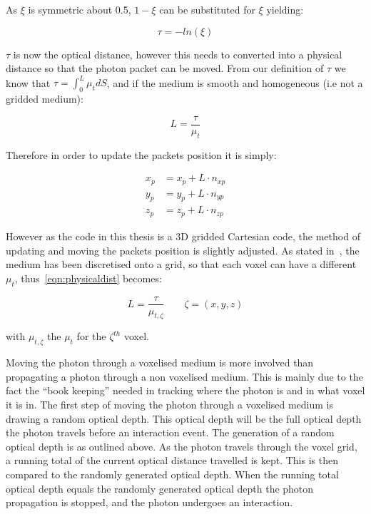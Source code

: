 As $\xi$ is symmetric about 0.5, $1-\xi$ can be substituted for $\xi$ yielding:

\begin{equation}
\tau=-ln(\xi)\label{eqn:taueqn}
\end{equation} 

$\tau$ is now the optical distance, however this needs to converted into a physical distance so that the photon packet can be moved. From our definition of $\tau$ we know that $\tau=\int_0^L\mu_tdS$, and if the medium is smooth and homogeneous (i.e not a gridded medium): 

\begin{equation}
L=\frac{\tau}{\mu_t}\label{eqn:physicaldist}
\end{equation}

Therefore in order to update the packets position it is simply:

\begin{align}
x_p &= x_p+L\cdot n_{xp}\label{eqn:update1}\\
y_p &= y_p+L\cdot n_{yp}\label{eqn:update2}\\
z_p &= z_p+L\cdot n_{zp}\label{eqn:update3}
\end{align}

However as the code in this thesis is a 3D gridded Cartesian code, the method of updating and moving the packets position is slightly adjusted. As stated in~, the medium has been discretised onto a grid, so that each voxel can have a different $\mu_t$, thus~\cref{eqn:physicaldist} becomes:

\begin{equation}
L=\frac{\tau}{\mu_{t,\zeta}}\quad\quad \zeta=(x,y,z)
\label{eqn:voxeloptdist}
\end{equation}

with $\mu_{t,\zeta}$ the $\mu_t$ for the $\zeta^{th}$ voxel. 

Moving the photon through a voxelised medium is more involved than propagating a photon through a non voxelised medium. 
This is mainly due to the fact the ``book keeping'' needed in tracking where the photon is and in what voxel it is in.
The first step of moving the photon through a voxelised medium is drawing a random optical depth.
This optical depth will be the full optical depth the photon travels before an interaction event.
The generation of a random optical depth is as outlined above.
As the photon travels through the voxel grid, a running total of the current optical distance travelled is kept.
This is then compared to the randomly generated optical depth.
When the running total optical depth equals the randomly generated optical depth the photon propagation is stopped, and the photon undergoes an interaction.

